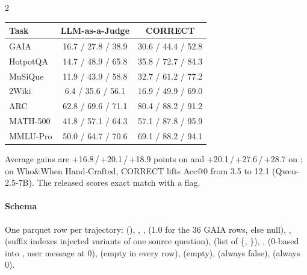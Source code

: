 \begin{multicols}{2}
\begin{center}\small
\begin{tabular}{@{}lcc@{}}\toprule
Task & LLM-as-a-Judge & CORRECT\\\midrule
GAIA & 16.7 / 27.8 / 38.9 & 30.6 / 44.4 / 52.8\\
HotpotQA & 14.7 / 48.9 / 65.8 & 35.8 / 72.7 / 84.3\\
MuSiQue & 11.9 / 43.9 / 58.8 & 32.7 / 61.2 / 77.2\\
2Wiki & 6.4 / 35.6 / 56.1 & 16.9 / 49.9 / 69.0\\
ARC & 62.8 / 69.6 / 71.1 & 80.4 / 88.2 / 91.2\\
MATH-500 & 41.8 / 57.1 / 64.3 & 57.1 / 87.8 / 95.9\\
MMLU-Pro & 50.0 / 64.7 / 70.6 & 69.1 / 88.2 / 94.1\\\bottomrule
\end{tabular}
\end{center}
Average gains are +16.8\,/\,+20.1\,/\,+18.9 points on  and +20.1\,/\,+27.6\,/\,+28.7 on ; on Who\&When Hand-Crafted, CORRECT lifts Acc@0 from 3.5 to 12.1 (Qwen-2.5-7B). The released  scores exact match with a  flag.

\paragraph{Schema} One parquet row per trajectory:  (), , ,  (1.0 for the 36 GAIA  rows, else null), ,  (suffix  indexes injected variants of one source question),  (list of \{, \}), ,  (0-based into , user message at 0),  (empty in every row),  (empty),  (always false),  (always 0).
\end{multicols}

